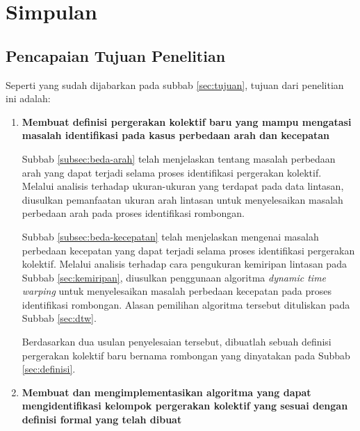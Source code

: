 \chapter{Simpulan}
\label{chap:simpulan}

\section{Pencapaian Tujuan Penelitian}
\label{sec:pencapaian-tujuan}

Seperti yang sudah dijabarkan pada subbab \ref{sec:tujuan}, tujuan dari penelitian ini adalah:

\begin{enumerate}
    \iffalse
    
    \item \textbf{Menentukan ukuran-ukuran lintasan yang dapat digunakan untuk membuat sebuah definisi pola pergerakan kolektif baru yang mampu mengatasi masalah identifikasi pada kasus perbedaan arah dan kecepatan}
    
    \fi
    
    \item \textbf{Membuat definisi pergerakan kolektif baru yang mampu mengatasi masalah identifikasi pada kasus perbedaan arah dan kecepatan}
    
    Subbab \ref{subsec:beda-arah} telah menjelaskan tentang masalah perbedaan arah yang dapat terjadi selama proses identifikasi pergerakan kolektif. Melalui analisis terhadap ukuran-ukuran yang terdapat pada data lintasan, diusulkan pemanfaatan ukuran arah lintasan untuk menyelesaikan masalah perbedaan arah pada proses identifikasi rombongan.
    
    Subbab \ref{subsec:beda-kecepatan} telah menjelaskan mengenai masalah perbedaan kecepatan yang dapat terjadi selama proses identifikasi pergerakan kolektif. Melalui analisis terhadap cara pengukuran kemiripan lintasan pada Subbab \ref{sec:kemiripan}, diusulkan penggunaan algoritma \textit{dynamic time warping} untuk menyelesaikan masalah perbedaan kecepatan pada proses identifikasi rombongan. Alasan pemilihan algoritma tersebut dituliskan pada Subbab \ref{sec:dtw}.
    
    Berdasarkan dua usulan penyelesaian tersebut, dibuatlah sebuah definisi pergerakan kolektif baru bernama rombongan yang dinyatakan pada Subbab \ref{sec:definisi}.
    
    \item \textbf{Membuat dan mengimplementasikan algoritma yang dapat mengidentifikasi kelompok pergerakan kolektif yang sesuai dengan definisi formal yang telah dibuat}
    

\end{enumerate}
